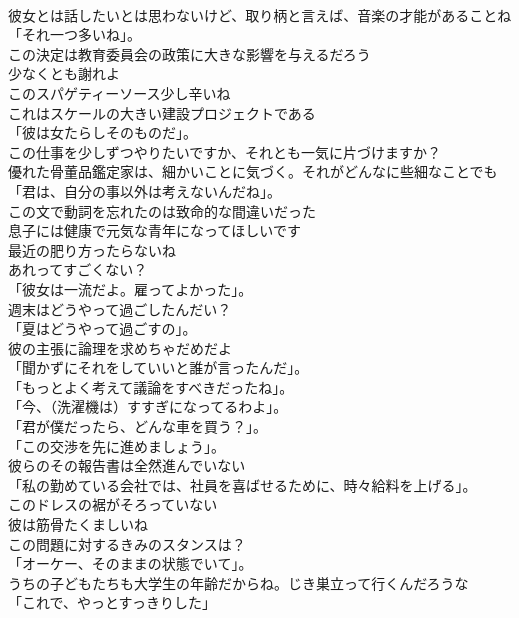 \documentclass[8pt]{extreport}
\begin{document}
\begin{CJK}{UTF8}{min}
\\	彼女とは話したいとは思わないけど、取り柄と言えば、音楽の才能があることね	
\\	「それ一つ多いね」。	
\\	この決定は教育委員会の政策に大きな影響を与えるだろう	
\\	少なくとも謝れよ	
\\	このスパゲティーソース少し辛いね	
\\	これはスケールの大きい建設プロジェクトである	
\\	「彼は女たらしそのものだ」。	
\\	この仕事を少しずつやりたいですか、それとも一気に片づけますか？	
\\	優れた骨董品鑑定家は、細かいことに気づく。それがどんなに些細なことでも	
\\	「君は、自分の事以外は考えないんだね」。	
\\	この文で動詞を忘れたのは致命的な間違いだった	
\\	息子には健康で元気な青年になってほしいです	
\\	最近の肥り方ったらないね	
\\	あれってすごくない？	
\\	「彼女は一流だよ。雇ってよかった」。	
\\	週末はどうやって過ごしたんだい？	
\\	「夏はどうやって過ごすの」。	
\\	彼の主張に論理を求めちゃだめだよ	
\\	「聞かずにそれをしていいと誰が言ったんだ」。	
\\	「もっとよく考えて議論をすべきだったね」。	
\\	「今、（洗濯機は）すすぎになってるわよ」。	
\\	「君が僕だったら、どんな車を買う？」。	
\\	「この交渉を先に進めましょう」。	
\\	彼らのその報告書は全然進んでいない	
\\	「私の勤めている会社では、社員を喜ばせるために、時々給料を上げる」。	
\\	このドレスの裾がそろっていない	
\\	彼は筋骨たくましいね	
\\	この問題に対するきみのスタンスは？	
\\	「オーケー、そのままの状態でいて」。	
\\	うちの子どもたちも大学生の年齢だからね。じき巣立って行くんだろうな	
\\	「これで、やっとすっきりした」	

\end{CJK}
\end{document}
